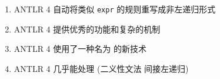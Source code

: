 
\begin{frame}{}
  \begin{center}
  \end{center}

  \begin{enumerate}[(1)]
    \setlength{\itemsep}{8pt}
    \pause
    \item ANTLR 4 自动将类似 \texttt{expr} 的规则重写成非左递归形式
    \pause
    \item ANTLR 4 提供优秀的功能和复杂的机制
    \pause
    \item ANTLR 4 使用了一种名为  的新技术
    \pause
    \item ANTLR 4 几乎能处理 (二义性文法\cmark \;\; 间接左递归\xmark)
  \end{enumerate}
\end{frame}

